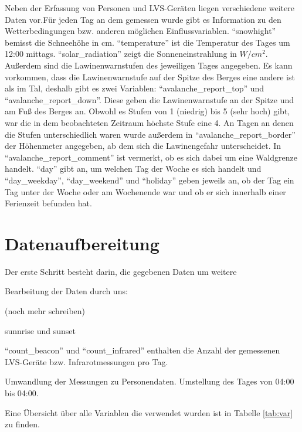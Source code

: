\documentclass[12pt]{scrreprt}
\begin{document}
Neben der Erfassung von Personen und LVS-Geräten liegen verschiedene weitere Daten vor.Für jeden Tag an dem gemessen wurde gibt es Information zu den Wetterbedingungen bzw. anderen möglichen Einflussvariablen. "`snowhight"' bemisst die Schneehöhe in cm. "`temperature"' ist die Temperatur des Tages um 12:00 mittags. "`solar\_radiation"' zeigt die Sonneneinstrahlung in $W/cm^2$. Außerdem sind die Lawinenwarnstufen des jeweiligen Tages angegeben. Es kann vorkommen, dass die Lawinenwarnstufe auf der Spitze des Berges eine andere ist als im Tal, deshalb gibt es zwei Variablen: "`avalanche\_report\_top"' und "`avalanche\_report\_down"'. Diese geben die Lawinenwarnstufe an der Spitze und am Fuß des Berges an. Obwohl es Stufen von 1 (niedrig) bis 5 (sehr hoch) gibt, war die in dem beobachteten Zeitraum höchste Stufe eine 4. An Tagen an denen die Stufen unterschiedlich waren wurde außerdem in "`avalanche\_report\_border"' der Höhenmeter angegeben, ab dem sich die Lawinengefahr unterscheidet. In "`avalanche\_report\_comment"' ist vermerkt, ob es sich dabei um eine Waldgrenze handelt. "`day"' gibt an, um welchen Tag der Woche es sich handelt und "`day\_weekday"', "`day\_weekend"' und "`holiday"' geben jeweils an, ob der Tag ein Tag unter der Woche oder am Wochenende war und ob er sich innerhalb einer Ferienzeit befunden hat.



\section{Datenaufbereitung}

Der erste Schritt besteht darin, die gegebenen Daten um weitere 

Bearbeitung der Daten durch uns:

(noch mehr schreiben)

sunnrise und sunset

"`count\_beacon"' und "`count\_infrared"' enthalten die Anzahl der gemessenen LVS-Geräte bzw. Infrarotmessungen pro Tag.

Umwandlung der Messungen zu Personendaten. Umstellung des Tages von 04:00 bis 04:00.

Eine Übersicht über alle Variablen die verwendet wurden ist in Tabelle \ref{tab:var} zu finden.
\end{document}
